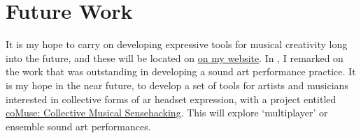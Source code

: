 \section{Future Work}\label{sec: conclusion-futurework}
It is my hope to carry on developing expressive tools for musical creativity long into the future, and these will be located on \href{https://sambilbow.com}{on my website}. In \textit{}, I remarked on the work that was outstanding in developing a sound \gls{art} performance practice. It is my hope in the near future, to develop a set of tools for artists and musicians interested in collective forms of \gls{ar} headset expression, with a project entitled \href{https://www.sambilbow.com/projects/comuse}{coMuse: Collective Musical Sensehacking}. This will explore `multiplayer' or ensemble sound \gls{art} performances.
